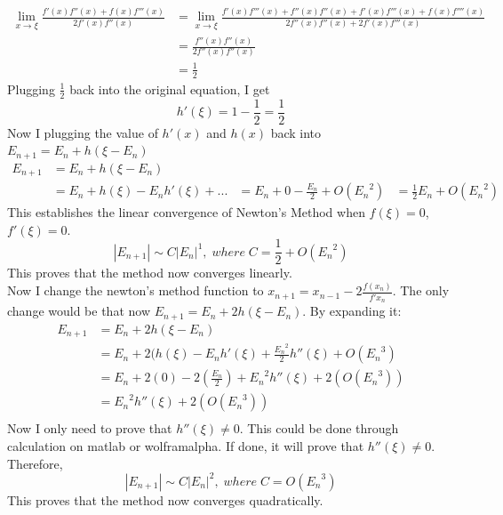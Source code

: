 \documentclass{article}
\begin{document}
\begin{equation*}
\begin{aligned}
\lim_{x\to\xi} \frac{f'(x)f''(x) + f(x)f'''(x)}{2f'(x)f''(x)} &= \lim_{x\to\xi} \frac{f'(x)f'''(x) + f''(x)f''(x) + f'(x)f'''(x) + f(x)f''''(x)}{2f''(x)f''(x)+2f'(x)f'''(x)}\\
&= \frac{f''(x)f''(x)}{2f''(x)f''(x)}\\
&= \frac{1}{2}
\end{aligned}
\end{equation*} 
Plugging $\frac{1}{2}$ back into the original equation, I get
\begin{equation*}
h'(\xi) = 1 - \frac{1}{2} = \frac{1}{2} 
\end{equation*}
Now I plugging the value of $h'(x)$ and $h(x)$ back into $E_{n+1} = E_n + h(\xi - E_n )$
\begin{equation*}
\begin{aligned}
E_{n+1} &= E_n + h(\xi - E_n )\\
&= E_n + h(\xi) - E_nh'(\xi) + ...
&= E_n + 0 - \frac{E_n}{2} + O({E_n}^2)
&= \frac{1}{2}E_n + O({E_n}^2)
\end{aligned}
\end{equation*}
This establishes the linear convergence of Newton's Method when $f(\xi) = 0$,$f'(\xi) = 0$.
\begin{equation*}
|E_{n+1}| \sim C|E_n|^1,\;where\;C=\frac{1}{2} + O({E_n}^2)
\end{equation*}
This proves that the method now converges linearly.\\
Now I change the newton's method function to $x_{n+1} = x_{n-1} - 2\frac{f(x_n)}{f'{x_n}}$. The only change would be that now $E_{n+1} = E_n + 2h(\xi - E_n)$. By expanding it:
\begin{equation*}
\begin{aligned}
E_{n+1} &= E_n + 2h(\xi - E_n )\\
&= E_n + 2(h(\xi) - E_nh'(\xi) + \frac{{E_n}^2}{2}h''(\xi) + O({E_n}^3) \\
&= E_n + 2(0) - 2(\frac{E_n}{2}) + {E_n}^2h''(\xi) + 2(O({E_n}^3)) \\
& = {E_n}^2h''(\xi) + 2(O({E_n}^3)) \\
\end{aligned}
\end{equation*}
Now I only need to prove that $h''(\xi) \neq 0$. This could be done through calculation on matlab or wolframalpha. If done, it will prove that $h''(\xi) \neq 0$.
Therefore,
\begin{equation*}
|E_{n+1}| \sim C|E_n|^2,\;where\;C= O({E_n}^3)
\end{equation*}
This proves that the method now converges quadratically.
\end{document}
